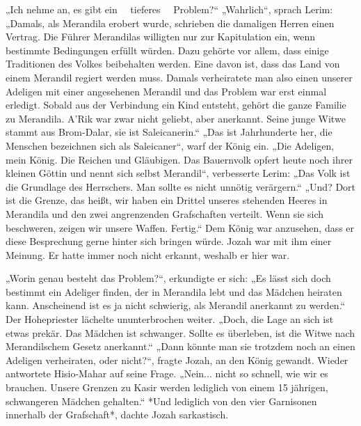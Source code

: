 „Ich nehme an, es gibt ein ~~tieferes~~ Problem?“
„Wahrlich“, sprach Lerim: „Damals, als Merandila erobert wurde, schrieben die damaligen Herren einen 
Vertrag. Die Führer Merandilas willigten nur zur Kapitulation ein, wenn bestimmte Bedingungen 
erfüllt würden. Dazu gehörte vor allem, dass einige Traditionen des Volkes beibehalten werden. Eine 
davon ist, dass das Land von einem Merandil regiert werden muss. Damals verheiratete man also einen 
unserer Adeligen mit einer angesehenen Merandil und das Problem war erst einmal erledigt. Sobald aus 
der Verbindung ein Kind entsteht, gehört die ganze Familie zu Merandila. A'Rik war zwar nicht 
geliebt, aber anerkannt. Seine junge Witwe stammt aus Brom-Dalar, sie ist Saleicanerin.“
„Das ist Jahrhunderte her, die Menschen bezeichnen sich als Saleicaner“, warf der König ein.
„Die Adeligen, mein König. Die Reichen und Gläubigen. Das Bauernvolk opfert heute noch ihrer kleinen 
Göttin und nennt sich selbst Merandil“, verbesserte Lerim: „Das Volk ist die Grundlage des 
Herrschers. Man sollte es nicht unnötig verärgern.“
„Und? Dort ist die Grenze, das heißt, wir haben ein Drittel unseres stehenden Heeres in Merandila 
und den zwei angrenzenden Grafschaften verteilt. Wenn sie sich beschweren, zeigen wir unsere Waffen. 
Fertig.“
Dem König war anzusehen, dass er diese Besprechung gerne hinter sich bringen würde. Jozah war mit 
ihm einer Meinung. Er hatte immer noch nicht erkannt, weshalb er hier war.

„Worin genau besteht das Problem?“, erkundigte er sich: „Es lässt sich doch bestimmt ein Adeliger 
finden, der in Merandila lebt und das Mädchen heiraten kann. Anscheinend ist es ja nicht schwierig, 
als Merandil anerkannt zu werden.“
Der Hohepriester lächelte ununterbrochen weiter. „Doch, die Lage an sich ist etwas prekär. Das 
Mädchen ist schwanger. Sollte es überleben, ist die Witwe nach Merandilschem Gesetz anerkannt.“
„Dann könnte man sie trotzdem noch an einen Adeligen verheiraten, oder nicht?“, fragte Jozah, an den 
König gewandt.
Wieder antwortete Hisio-Mahar auf seine Frage. „Nein... nicht so schnell, wie wir es brauchen. 
Unsere Grenzen zu Kasir werden lediglich von einem 15 jährigen, schwangeren Mädchen gehalten.“
*Und lediglich von den vier Garnisonen innerhalb der Grafschaft*, dachte Jozah sarkastisch.

